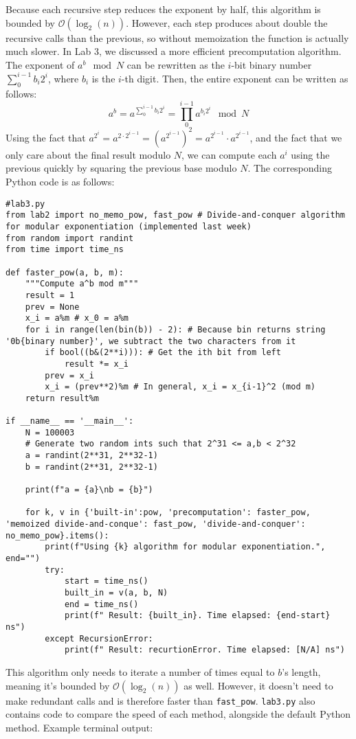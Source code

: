 \documentclass[a4paper,10pt]{article}
\begin{document}
Because each recursive step reduces the exponent by half, this algorithm is bounded by $\mathcal{O}(\log_2(n))$. However, each step produces about double the recursive calls than the previous, so without memoization the function is actually much slower.
\newpage
In Lab 3, we discussed a more efficient precomputation algorithm. The exponent of $a^b \mod N$ can be rewritten as the $i$-bit binary number $\sum_{0}^{i-1}b_i2^i$, where $b_i$ is the $i$-th digit. Then, the entire exponent can be written as follows:
$$ a^b = a^{\sum_{0}^{i-1}b_i2^i} = \prod_{0}^{i-1} a^{b_i2^i} \mod N$$
Using the fact that $a^{2^i} = a^{2 \cdot 2^{i-1}} = (a^{2^{i-1}})^2 =  a^{2^{i-1}} \cdot a^{2^{i-1}}$, and the fact that we only care about the final result modulo $N$, we can compute each $a^i$ using the previous quickly by squaring the previous base modulo $N$. The corresponding Python code is as follows:
\begin{lstlisting}
#lab3.py
from lab2 import no_memo_pow, fast_pow # Divide-and-conquer algorithm for modular exponentiation (implemented last week)
from random import randint
from time import time_ns

def faster_pow(a, b, m):
    """Compute a^b mod m"""
    result = 1
    prev = None
    x_i = a%m # x_0 = a%m
    for i in range(len(bin(b)) - 2): # Because bin returns string '0b{binary number}', we subtract the two characters from it
        if bool((b&(2**i))): # Get the ith bit from left
            result *= x_i
        prev = x_i
        x_i = (prev**2)%m # In general, x_i = x_{i-1}^2 (mod m)
    return result%m

if __name__ == '__main__':
    N = 100003
    # Generate two random ints such that 2^31 <= a,b < 2^32
    a = randint(2**31, 2**32-1)
    b = randint(2**31, 2**32-1)

    print(f"a = {a}\nb = {b}")

    for k, v in {'built-in':pow, 'precomputation': faster_pow, 'memoized divide-and-conque': fast_pow, 'divide-and-conquer': no_memo_pow}.items():
        print(f"Using {k} algorithm for modular exponentiation.", end="")
        try:
            start = time_ns()
            built_in = v(a, b, N)
            end = time_ns()
            print(f" Result: {built_in}. Time elapsed: {end-start} ns")
        except RecursionError:
            print(f" Result: recurtionError. Time elapsed: [N/A] ns")
\end{lstlisting}
This algorithm only needs to iterate a number of times equal to $b$'s length, meaning it's bounded by $\mathcal{O}(\log_2(n))$ as well. However, it doesn't need to make redundant calls and is therefore faster than \verb|fast_pow|. \verb|lab3.py| also contains code to compare the speed of each method, alongside the default Python method. Example terminal output:
\end{document}
